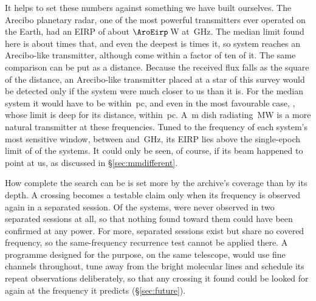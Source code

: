 It helps to set these numbers against something we have built ourselves.
The Arecibo planetary radar, one of the most powerful transmitters ever
operated on the Earth, had an EIRP of about $\AroEirp$\,W at
\AroFreqGHz\,GHz. The median limit found here is about \AroMedMult{} times
that, and even the deepest is \AroDeepMult{} times it, so
\AroNSysBelowWord{} system reaches an Arecibo-like transmitter, although
\AroNSysTen{} come within a factor of ten of it. The same comparison can be
put as a distance. Because the received flux falls as the square of the
distance, an Arecibo-like transmitter placed at a star of this survey would
be detected only if the system were much closer to us than it is. For the
median system it would have to be within \AroDistMedPc\,pc, and even in the
most favourable case, \AroDistMaxStar, whose limit is deep for its distance,
within \AroDistMaxPc\,pc. A \BenchDiam\,m dish radiating \BenchPowerMW\,MW is
a more natural transmitter at these frequencies. Tuned to the frequency of
each system's most sensitive window, between \BenchTunedFreqLo{} and
\BenchTunedFreqHi\,GHz, its EIRP lies above the single-epoch limit of
\BenchNSysTuned{} of the \NSysALimSum{} systems. It could only be seen, of
course, if its beam happened to point at us, as discussed in
\S\ref{sec:mmdifferent}.

How complete the search can be is set more by the archive's coverage than by
its depth. A crossing becomes a testable claim only when its frequency is
observed again in a separated session. Of the \NSysClassA{} systems,
\ZcNoRepNoSep{} were never observed in two separated sessions at all, so that
nothing found toward them could have been confirmed at any power. For
\ZcNoRepNoFreqWord{} more, separated sessions exist but share no covered
frequency, so the same-frequency recurrence test cannot be applied there. A
programme designed for the purpose, on the same telescope, would use fine
channels throughout, tune away from the bright molecular lines and schedule its repeat observations deliberately, so that
any crossing it found could be looked for again at the frequency it predicts
(\S\ref{sec:future}).
